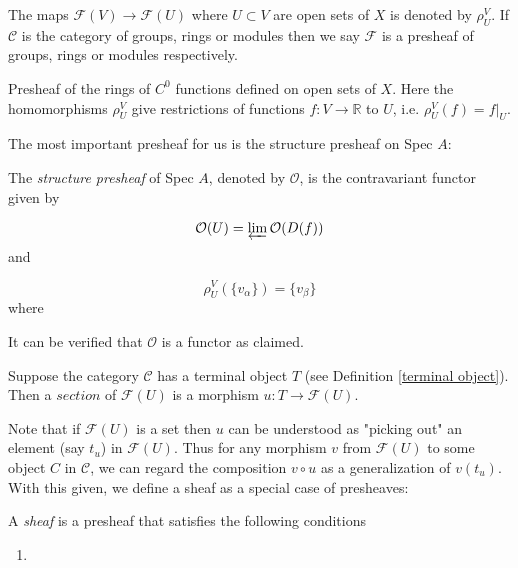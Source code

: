 \documentclass[ag.tex]{subfiles}
\begin{document}
The maps $\mathcal{F}(V) \to \mathcal{F}(U)$ where $U \subset V$ are open sets of $X$ is denoted by $\rho_U^V$.  If $\mathcal{C}$ is the category of groups, rings or modules then we say $\mathcal{F}$ is a presheaf of groups, rings or modules respectively. 

\begin{exmp}\label{sheaf_of_rings_of_cont_fun}
Presheaf of the rings of $C^0$ functions defined on open sets of $X$. Here the homomorphisms $\rho_U^V$ give restrictions of functions $f: V \to \mathbb{R}$ to $U$, i.e.  $\rho_U^V (f) = f|_{U}$.
\end{exmp}

The most important presheaf for us is the structure presheaf on Spec $A$:

\begin{definition}
The \textit{structure presheaf} of Spec $A$, denoted by $\mathcal{O}$,  is the contravariant functor given by 

\begin{equation}
\mathcal{O}(U) = \varprojlim \mathcal{O}(D(f))
\end{equation}
and 

\begin{equation}
\rho_U^V(\{v_\alpha\}) = \{v_\beta\}
\end{equation}
where 
\end{definition}

It can be verified that $\mathcal{O}$ is a functor as claimed.  

\begin{definition}
Suppose the category $\mathcal{C}$ has a terminal object $T$ (see Definition \ref{terminal object}).  Then a $\textit{section}$ of $\mathcal{F}(U)$ is a morphism $u: T \to \mathcal{F}(U)$.
\end{definition}

Note that if $\mathcal{F}(U)$ is a set then $u$ can be understood as "picking out" an element (say $t_u$) in $\mathcal{F}(U)$.  Thus for any morphism $v$ from $\mathcal{F}(U)$ to some object $C$ in $\mathcal{C}$,  we can regard the composition $v \circ u$ as a generalization of $v(t_u)$. With this given, we define a sheaf as a special case of presheaves:

\begin{definition}
A \textit{sheaf} is a presheaf that satisfies the following conditions
\begin{enumerate}
\item 
\end{enumerate}
\end{definition}
\end{document}
